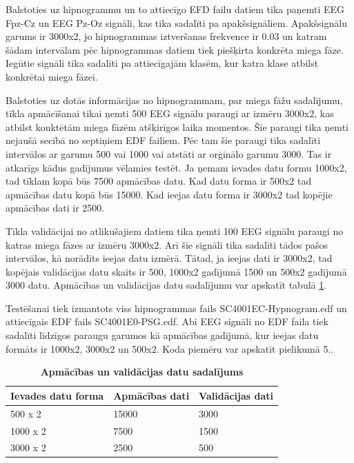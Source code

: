 \documentclass[12pt,paper=A4]{report}
\begin{document}
Balstoties uz hipnogrammu un to attiecīgo EFD failu datiem tika paņemti EEG Fpz-Cz un EEG Pz-Oz signāli, kas tika sadalīti pa apakšsignāliem. Apakšsignālu garums ir 3000x2, jo hipnogrammas iztveršanas frekvence ir 0.03 un katram šādam intervālam pēc hipnogrammas datiem tiek piešķirta konkrēta miega fāze. Iegūtie signāli tika sadalīti pa attiecīgajām klasēm, kur katra klase atbilst konkrētai miega fāzei. 

Balstoties uz dotās informācijas no hipnogrammam, par miega fāžu sadalījumu, tīkla apmācīšanai tikai ņemti 500 EEG signālu paraugi ar izmēru 3000x2, kas atbilst konktētām miega fāzēm atšķirīgos laika momentos. Šie paraugi tika ņemti nejaušā secībā no septiņiem EDF failiem. Pēc tam šie paraugi tika sadalīti intervālos ar garumu 500 vai 1000 vai atstāti ar orģinālo garumu 3000. Tas ir atkarīgs kādus gadījumus vēlamies testēt. Ja ņemam ievades datu formu 1000x2, tad tīklam kopā būs 7500 apmācības datu. Kad datu forma ir 500x2 tad apmācības datu kopā būs 15000. Kad ieejas datu forma ir 3000x2 tad kopējie apmācības dati ir 2500.

Tīkla validācijai no atlikušajiem datiem tika ņemti 100 EEG signālu paraugi no katras miega fāzes ar izmēru 3000x2. Arī šie signāli tika sadalīti tādos pašos intervālos, kā norādīts ieejas datu izmērā. Tātad, ja ieejas dati ir 3000x2, tad kopējais validācijas datu skaits ir 500, 1000x2 gadījumā 1500 un 500x2 gadījumā 3000 datu. Apmācības un validācijas datu sadalījumu var apskatīt tabulā \ref{dataTablehhh}.

Testēšanai tiek izmantots viss hipnogrammas fails SC4001EC-Hypnogram.edf un attiecīgais EDF fails SC4001E0-PSG.edf. Abi EEG signāli no EDF faila tiek sadalīti līdzīgos paraugu garumos kā apmācības gadījumā, kur ieejas datu formāts ir 1000x2, 3000x2 un 500x2. Koda piemēru var apskatīt pielikumā 5.. 


\begin{table}[H]
\centering
\caption{}
\captionsetup{justification=centering}
\caption*{\textbf{Apmācības un validācijas datu sadalījums}}
\begin{tabular}{|l|l|l|}
\hline
\multicolumn{1}{|c|}{Ievades datu forma} & Apmācības dati & Validācijas dati \\ \hline
500 x 2 & 15000 & 3000 \\ \hline
1000 x 2 & 7500 & 1500 \\ \hline
3000 x 2 & 2500 & 500 \\ \hline
\end{tabular}
\label{dataTablehhh}
\end{table}
\end{document}
